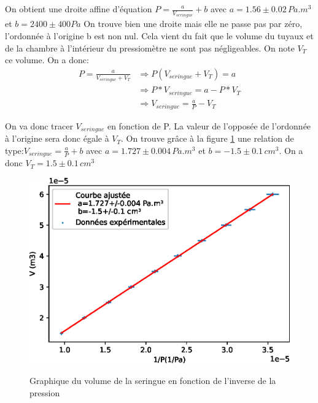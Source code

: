 \documentclass[12pt]{article}
\begin{document}
On obtient une droite affine d'équation $P=\frac{a}{V_{seringue}}+b$ avec $a=1.56\pm 0.02\, Pa.m^3$ et $b=2400\pm 400 Pa$
On trouve bien une droite mais elle ne passe pas par zéro, l'ordonnée à l'origine b est non nul. Cela vient du fait que le volume du tuyaux et de la chambre à l'intérieur du pressiomètre ne sont pas négligeables. On note $V_T$ ce volume. On a donc:
\begin{align*}
P=\frac{a}{V_{seringue}+V_T}&\Rightarrow P(V_{seringue}+V_T)=a \\
	&\Rightarrow P*V_{seringue}=a-P*V_T \\
	&\Rightarrow V_{seringue}=\frac{a}{P}-V_T
\end{align*}

On va donc tracer $V_{seringue}$ en fonction de P. La valeur de l'opposée de l'ordonnée à l'origine sera donc égale à $V_T$. On trouve grâce à la figure \ref{Graphique 2 Exp1} une relation de type:$V_{seringue}=\frac{a}{P}+b$ avec $a=1.727\pm0.004\, Pa.m^3$ et $b=-1.5\pm 0.1\, cm^3$. On a donc $V_T=1.5\pm 0.1\, cm^3$

\newpage
\begin{figure}[h!]
	\begin{center}
		\includegraphics[scale=1]{img/G2Exp1.eps}
		\label{Graphique 2 Exp1}
		\caption{Graphique du volume de la seringue en fonction de l'inverse de la pression}
	\end{center}
\end{figure}
\end{document}
